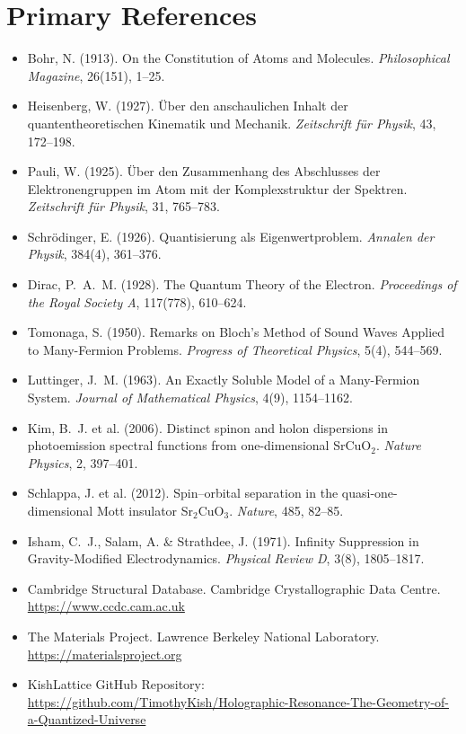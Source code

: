 \documentclass[11pt, letterpaper, openany]{book}
\begin{document}
\section*{Primary References}
\begin{itemize}
    \item Bohr, N. (1913). On the Constitution of Atoms and Molecules.
    \textit{Philosophical Magazine}, 26(151), 1--25.

    \item Heisenberg, W. (1927). Über den anschaulichen Inhalt der
    quantentheoretischen Kinematik und Mechanik.
    \textit{Zeitschrift für Physik}, 43, 172--198.

    \item Pauli, W. (1925). Über den Zusammenhang des Abschlusses
    der Elektronengruppen im Atom mit der Komplexstruktur der Spektren.
    \textit{Zeitschrift für Physik}, 31, 765--783.

    \item Schrödinger, E. (1926). Quantisierung als Eigenwertproblem.
    \textit{Annalen der Physik}, 384(4), 361--376.

    \item Dirac, P.~A.~M. (1928). The Quantum Theory of the Electron.
    \textit{Proceedings of the Royal Society A}, 117(778), 610--624.

    \item Tomonaga, S. (1950). Remarks on Bloch's Method of Sound
    Waves Applied to Many-Fermion Problems.
    \textit{Progress of Theoretical Physics}, 5(4), 544--569.

    \item Luttinger, J.~M. (1963). An Exactly Soluble Model of a
    Many-Fermion System. \textit{Journal of Mathematical Physics},
    4(9), 1154--1162.

    \item Kim, B.~J. et al. (2006). Distinct spinon and holon
    dispersions in photoemission spectral functions from
    one-dimensional SrCuO$_2$. \textit{Nature Physics}, 2, 397--401.

    \item Schlappa, J. et al. (2012). Spin--orbital separation in the
    quasi-one-dimensional Mott insulator Sr$_2$CuO$_3$.
    \textit{Nature}, 485, 82--85.

    \item Isham, C.~J., Salam, A. \& Strathdee, J. (1971).
    Infinity Suppression in Gravity-Modified Electrodynamics.
    \textit{Physical Review D}, 3(8), 1805--1817.
	

    \item Cambridge Structural Database.
    Cambridge Crystallographic Data Centre.
    \url{https://www.ccdc.cam.ac.uk}

    \item The Materials Project.
    Lawrence Berkeley National Laboratory.
    \url{https://materialsproject.org}

    \item KishLattice GitHub Repository:
    \url{https://github.com/TimothyKish/Holographic-Resonance-The-Geometry-of-a-Quantized-Universe}
\end{itemize}
\end{document}
